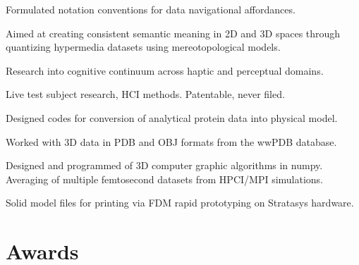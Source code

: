 \documentclass[letterpaper]{deedy-resume} %
\begin{document}
\begin{minipage}[t]{1\textwidth}
\sectionspace %



\vspace{\topsep} %
\begin{tightitemize}
\item Formulated notation conventions for data navigational affordances.
\item Aimed at creating consistent semantic meaning in 2D and 3D spaces through quantizing hypermedia datasets using mereotopological models.
\item Research into cognitive continuum across haptic and perceptual domains.  
\item Live test subject research, HCI methods.  Patentable, never filed.
\end{tightitemize}

\sectionspace %




\begin{tightitemize}
\item Designed codes for conversion of analytical protein data into physical model.
\item Worked with 3D data in PDB and OBJ formats from the wwPDB database.
\item Designed and programmed of 3D computer graphic algorithms in numpy. Averaging of multiple femtosecond datasets from HPCI/MPI simulations.
\item Solid model files for printing via FDM rapid prototyping on Stratasys hardware.
\end{tightitemize}

\sectionspace %



\section{Awards} 


\end{minipage}
\end{document}
